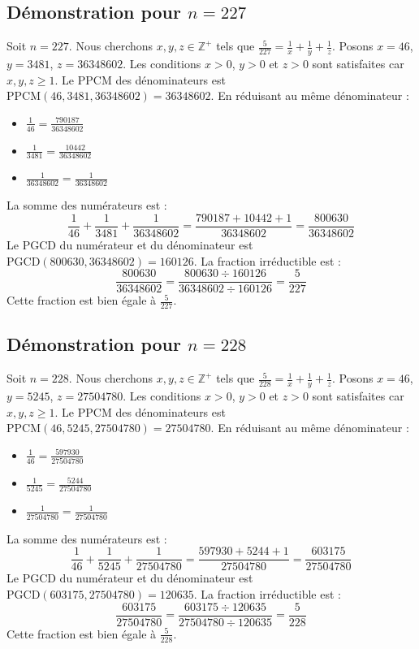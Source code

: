 \documentclass[11pt,a4paper]{article}
\begin{document}
\subsection{Démonstration pour $n = 227$}
Soit $n = 227$. Nous cherchons $x, y, z \in \mathbb{Z}^{+}$ tels que $\frac{5}{227} = \frac{1}{x} + \frac{1}{y} + \frac{1}{z}$.
Posons $x = 46$, $y = 3481$, $z = 36348602$.
Les conditions $x > 0$, $y > 0$ et $z > 0$ sont satisfaites car $x, y, z \geq 1$.
Le PPCM des dénominateurs est $\text{PPCM}(46, 3481, 36348602) = 36348602$.
En réduisant au même dénominateur :
\begin{itemize}
    \item $\frac{1}{46} = \frac{790187}{36348602}$
    \item $\frac{1}{3481} = \frac{10442}{36348602}$
    \item $\frac{1}{36348602} = \frac{1}{36348602}$
\end{itemize}
La somme des numérateurs est :
$$ \frac{1}{46} + \frac{1}{3481} + \frac{1}{36348602} = \frac{790187 + 10442 + 1}{36348602} = \frac{800630}{36348602} $$
Le PGCD du numérateur et du dénominateur est $\text{PGCD}(800630, 36348602) = 160126$.
La fraction irréductible est :
$$ \frac{800630}{36348602} = \frac{800630 \div 160126}{36348602 \div 160126} = \frac{5}{227} $$
Cette fraction est bien égale à $\frac{5}{227}$.

\subsection{Démonstration pour $n = 228$}
Soit $n = 228$. Nous cherchons $x, y, z \in \mathbb{Z}^{+}$ tels que $\frac{5}{228} = \frac{1}{x} + \frac{1}{y} + \frac{1}{z}$.
Posons $x = 46$, $y = 5245$, $z = 27504780$.
Les conditions $x > 0$, $y > 0$ et $z > 0$ sont satisfaites car $x, y, z \geq 1$.
Le PPCM des dénominateurs est $\text{PPCM}(46, 5245, 27504780) = 27504780$.
En réduisant au même dénominateur :
\begin{itemize}
    \item $\frac{1}{46} = \frac{597930}{27504780}$
    \item $\frac{1}{5245} = \frac{5244}{27504780}$
    \item $\frac{1}{27504780} = \frac{1}{27504780}$
\end{itemize}
La somme des numérateurs est :
$$ \frac{1}{46} + \frac{1}{5245} + \frac{1}{27504780} = \frac{597930 + 5244 + 1}{27504780} = \frac{603175}{27504780} $$
Le PGCD du numérateur et du dénominateur est $\text{PGCD}(603175, 27504780) = 120635$.
La fraction irréductible est :
$$ \frac{603175}{27504780} = \frac{603175 \div 120635}{27504780 \div 120635} = \frac{5}{228} $$
Cette fraction est bien égale à $\frac{5}{228}$.
\end{document}
